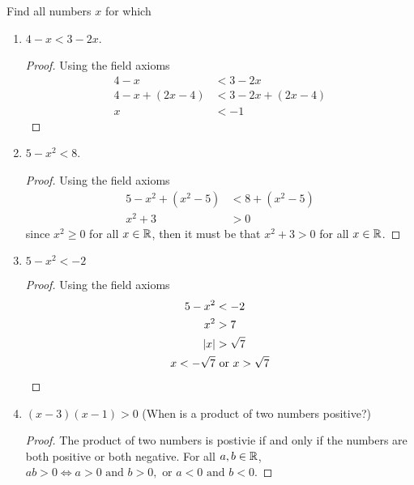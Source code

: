 \begin{exercise}[\textbf{4}] Find all numbers $x$ for which
     \begin{enumerate}
         \item $4-x < 3-2x$. 
         \begin{proof} Using the field axioms
              \begin{align*}
                  4-x &< 3-2x \\
                  4-x+(2x-4) &< 3-2x+(2x-4) \\
                  x &< -1
              \end{align*}
         \end{proof}
         \item $5-x^2 < 8$.
         \begin{proof} Using the field axioms
              \begin{align*}
                  5-x^2+(x^2-5) &< 8+(x^2-5) \\
                  x^2 +3&> 0 
              \end{align*}
              since $x^2\geq 0$ for all $x \in \mathbb{R}$, then it must be that $x^2+3
              > 0$ for all $x \in \mathbb{R}$.
         \end{proof}
         \item $5-x^2<-2$
         \begin{proof} Using the field axioms
              \begin{align*}
                  5-x^2 &< -2 \\
                  x^2 &> 7 \\
                  \left\lvert x\right\rvert &> \sqrt{7} \\
                  x < -\sqrt{7} &\text{ or } x>\sqrt{7}
              \end{align*}
         \end{proof}
         \item $(x-3)(x-1)>0$ (When is a product of two numbers positive?)
         \begin{proof} The product of two numbers is postivie if and only if the
         numbers are both positive or both negative. For all $a,b \in \mathbb{R}$, $ab
         >0 \Leftrightarrow a >0 \text{ and } b>0, \text{ or } a<0 \text{ and } b<0$.


\end{proof}
\end{enumerate}
\end{exercise}
